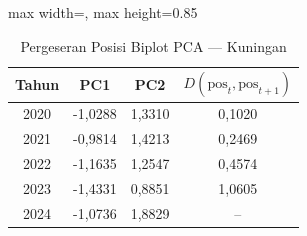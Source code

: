 \begin{table}[H]
\centering
\caption{Pergeseran Posisi Biplot PCA --- Kuningan} \label{tab:appjarak_pca_skor_kuningan}
\begin{adjustbox}{max width=\textwidth, max height=0.85\textheight}
\begin{tabular}{|c|c|c|c|}
\hline
\textbf{Tahun} & \textbf{PC1} & \textbf{PC2} & \textbf{$D(\text{pos}_t, \text{pos}_{t+1})$} \\
\hline
2020 & -1,0288 & 1,3310 & 0,1020 \\
2021 & -0,9814 & 1,4213 & 0,2469 \\
2022 & -1,1635 & 1,2547 & 0,4574 \\
2023 & -1,4331 & 0,8851 & 1,0605 \\
2024 & -1,0736 & 1,8829 & -- \\
\hline
\end{tabular}
\end{adjustbox}
\end{table}